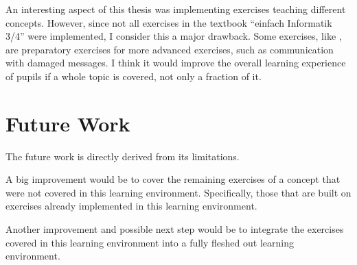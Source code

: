 An interesting aspect of this thesis was implementing exercises teaching different concepts. However, since not all exercises in the textbook “einfach Informatik 3/4” were implemented, I consider this a major drawback. Some exercises, like , are preparatory exercises for more advanced exercises, such as communication with damaged messages. I think it would improve the overall learning experience of pupils if a whole topic is covered, not only a fraction of it.

\section{Future Work}
\label{section:futureWork}

The future work is directly derived from its limitations.

A big improvement would be to cover the remaining exercises of a concept that were not covered in this learning environment. Specifically, those that are built on exercises already implemented in this learning environment.

Another improvement and possible next step would be to integrate the exercises covered in this learning environment into a fully fleshed out learning environment. 